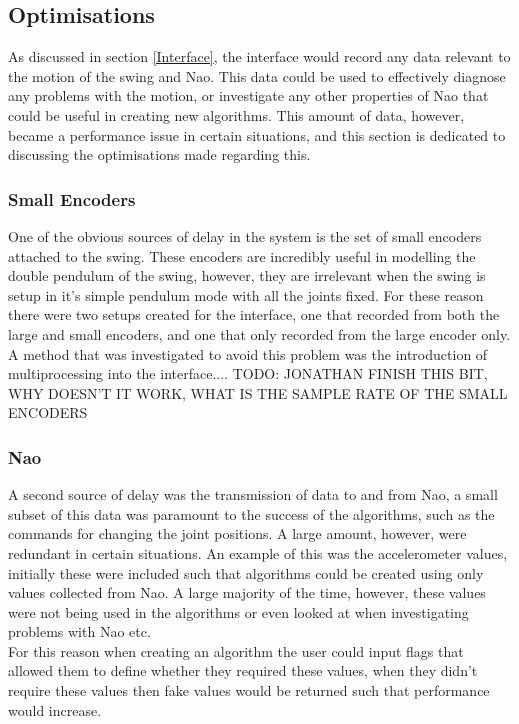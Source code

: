 \documentclass[11pt]{article}
\newcommand*\ruleline[1]{\par\noindent\raisebox{.8ex}{\makebox[\linewidth]{\hrulefill\hspace{1ex}\raisebox{-.8ex}{#1}\hspace{1ex}\hrulefill}}}
\begin{document}
\subsection{Optimisations}
As discussed in section \ref{Interface}, the interface would record any data relevant to the motion of the swing and Nao. This data could be used to effectively diagnose any problems with the motion, or investigate any other properties of Nao that could be useful in creating new algorithms. This amount of data, however, became a performance issue in certain situations, and this section is dedicated to discussing the optimisations made regarding this.

\subsubsection{Small Encoders}
\ruleline{Jonathan Matthews}
One of the obvious sources of delay in the system is the set of small encoders attached to the swing. These encoders are incredibly useful in modelling the double pendulum of the swing, however, they are irrelevant when the swing is setup in it's simple pendulum mode with all the joints fixed. For these reason there were two setups created for the interface, one that recorded from both the large and small encoders, and one that only recorded from the large encoder only.\\

A method that was investigated to avoid this problem was the introduction of multiprocessing into the interface....
TODO: JONATHAN FINISH THIS BIT, WHY DOESN'T IT WORK, WHAT IS THE SAMPLE RATE OF THE SMALL ENCODERS

\subsubsection{Nao}
\ruleline{George Sheppard}
A second source of delay was the transmission of data to and from Nao, a small subset of this data was paramount to the success of the algorithms, such as the commands for changing the joint positions. A large amount, however, were redundant in certain situations. An example of this was the accelerometer values, initially these were included such that algorithms could be created using only values collected from Nao. A large majority of the time, however, these values were not being used in the algorithms or even looked at when investigating problems with Nao etc.\\

For this reason when creating an algorithm the user could input flags that allowed them to define whether they required these values, when they didn't require these values then fake values would be returned such that performance would increase.\\
\end{document}
